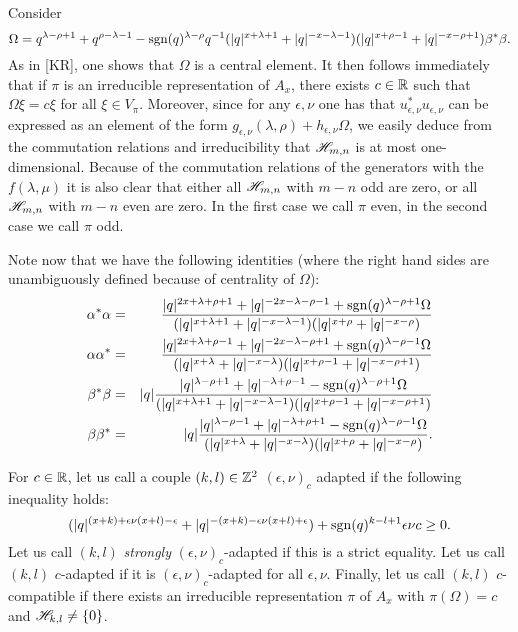 Consider \[\Omega =q^{\lambda-\rho+1}+q^{\rho-\lambda-1} - \operatorname{\mathrm{sgn}}(q)^{\lambda-\rho}q^{-1}(|q|^{x+\lambda+1}+|q|^{-x-\lambda-1})(|q|^{x+\rho-1}+|q|^{-x-\rho+1})\beta^*\beta.\] As in [KR], one shows that $\Omega$ is a central element. It then follows immediately that if $\pi$ is an irreducible representation of $A_x$, there exists $c\in \mathbb{R}$ such that $\Omega\xi = c\xi$ for all $\xi \in V_{\pi}$. Moreover, since for any $\epsilon,\nu$ one has that $u_{\epsilon,\nu}^*u_{\epsilon,\nu}$ can be expressed as an element of the form $g_{\epsilon,\nu}(\lambda,\rho) + h_{\epsilon,\nu}\Omega$, we easily deduce from the commutation relations and irreducibility that $\mathscr{H}_{m,n}$ is at most one-dimensional. Because of the commutation relations of the generators with the $f(\lambda,\mu)$ it is also clear that either all $\mathscr{H}_{m,n}$ with $m-n$ odd are zero, or all $\mathscr{H}_{m,n}$ with $m-n$ even are zero. In the first case we call $\pi$ even, in the second case we call $\pi$ odd. 


Note now that we have the following identities (where the right hand sides are unambiguously defined because of centrality of $\Omega$): 
\begin{eqnarray*}
\alpha^*\alpha &=& \frac{|q|^{2x+\lambda+\rho+1}+|q|^{-2x-\lambda-\rho-1}+\operatorname{\mathrm{sgn}}(q)^{\lambda-\rho+1}\Omega}{(|q|^{x+\lambda+1}+|q|^{-x-\lambda-1})(|q|^{x+\rho}+|q|^{-x-\rho})}\\
\alpha\alpha^* &=& \frac{|q|^{2x+\lambda+\rho-1}+|q|^{-2x-\lambda-\rho+1}+\operatorname{\mathrm{sgn}}(q)^{\lambda-\rho-1}\Omega}{(|q|^{x+\lambda}+|q|^{-x-\lambda})(|q|^{x+\rho-1}+|q|^{-x-\rho+1})}\\
\beta^*\beta &=& |q|\frac{|q|^{\lambda-\rho+1}+|q|^{-\lambda+\rho-1}-\operatorname{\mathrm{sgn}}(q)^{\lambda-\rho+1}\Omega}{(|q|^{x+\lambda+1}+|q|^{-x-\lambda-1})(|q|^{x+\rho-1}+|q|^{-x-\rho+1})}\\
\beta\beta^* &=&  |q|\frac{|q|^{\lambda-\rho-1}+|q|^{-\lambda+\rho+1}-\operatorname{\mathrm{sgn}}(q)^{\lambda-\rho-1}\Omega}{(|q|^{x+\lambda}+|q|^{-x-\lambda})(|q|^{x+\rho}+|q|^{-x-\rho})}.
\end{eqnarray*}

For $c\in\mathbb{R}$, let us call a couple $(k,l)\in \mathbb{Z}^2$ $(\epsilon,\nu)_c$ adapted if the following inequality holds: \begin{equation}\label{EqAd}(|q|^{(x+k)+\epsilon\nu(x+l)-\epsilon}+|q|^{-(x+k)-\epsilon\nu(x+l)+\epsilon})+\operatorname{\mathrm{sgn}}(q)^{k-l+1}\epsilon\nu c\geq 0.\end{equation} Let us call $(k,l)$ \emph{strongly} $(\epsilon,\nu)_c$-adapted if this is a strict equality. Let us call $(k,l)$ $c$-adapted if it is $(\epsilon,\nu)_c$-adapted for all $\epsilon,\nu$. Finally, let us call $(k,l)$ $c$-compatible if there exists an irreducible representation $\pi$ of $A_x$ with $\pi(\Omega) = c$ and $\mathscr{H}_{k,l}\neq \{0\}$. 

